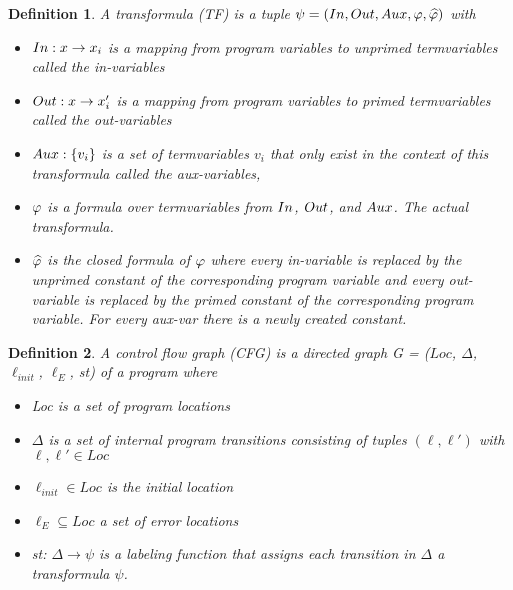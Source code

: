 \documentclass{article}
\newtheorem{mydef}{Definition}
\begin{document}
    \begin{mydef}
        A transformula (TF) is a tuple $\psi = (In, Out, Aux, \varphi, \widehat{\varphi})$ with 
        \begin{itemize}
          \item $In : x \rightarrow x_i$ is a mapping from program variables to unprimed termvariables called the in-variables
          \item $Out : x \rightarrow x_i'$ is a mapping from program variables to primed termvariables called the out-variables
          \item $Aux: \{ v_i \}$ is a set of termvariables $v_i$ that only exist in the context of this transformula called the aux-variables,
          \item $\varphi$ is a formula over termvariables from $In$, $Out$, and $Aux$. The actual transformula.
          \item $\widehat{\varphi}$ is the closed formula of $\varphi$ where every in-variable is replaced by the unprimed constant of the corresponding program variable and every out-variable is replaced by the primed constant of the corresponding program variable. For every aux-var there is a newly created constant.
        \end{itemize}
    \end{mydef}

	\begin{mydef}
		A control flow graph (CFG) is a directed graph G = ($Loc$, $\Delta$, $\ell_{init}$, $\ell_E$, st) of a program where
		\begin{itemize}
			\item  Loc is a set of program locations
			\item $\Delta$ is a set of internal program transitions consisting of tuples $(\ell, \ell')$ with $\ell, \ell' \in Loc$
			\item $\ell_{init} \in Loc$ is the initial location
			\item $\ell_E \subseteq Loc$ a set of error locations
			\item st: $\Delta \rightarrow \psi$ is a labeling function that assigns each transition in $\Delta$ a transformula $\psi$.
		\end{itemize}
	\end{mydef} \noindent
	 \bigskip
\end{document}
